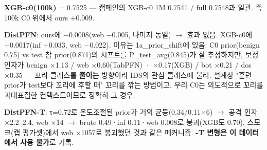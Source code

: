 \par\noindent \textbullet\enspace \textbf{XGB-c0(100k)} =\allowbreak{} 0.7525 — 캠페인의 XGB-c0 1M 0.7541 /\allowbreak{} full 0.7548과 일관. 즉 100k C0 위에서 ours +\allowbreak{}0.009.


\par\noindent \textbullet\enspace \textbf{DistPFN}: ours에 −0.0008(web −0.005, 나머지 동일)  \ensuremath{\rightarrow}  효과 없음. XGB-c0에 +\allowbreak{}0.0017(inf +\allowbreak{}0.033, web −0.022). 이유는 1a\_\allowbreak{}prior\_\allowbreak{}shift에 있음: C0 prior(benign 0.75) vs test 참 prior(0.871)의 시프트를 P\_\allowbreak{}test\_\allowbreak{}avg(0.845)가 잘 추정하지만, 보정 인자가 benign ×1.13 /\allowbreak{} web ×0.60(TabPFN) · ×0.17(XGB) /\allowbreak{} bot ×0.21 /\allowbreak{} dos ×0.35 — 꼬리 클래스를 \textbf{줄이는} 방향이라 IDS의 관심 클래스에 불리. 설계상 "훈련 prior가 test보다 꼬리에 후할 때" 꼬리를 깎는 방법이고, 우리 C0는 의도적으로 꼬리를 과대표집한 컨텍스트이므로 정확히 그 경우.


\par\noindent \textbullet\enspace \textbf{DistPFN-T}: τ=\allowbreak{}0.72로 온도조절된 prior가 거의 균등(0.34/\allowbreak{}0.11×6)  \ensuremath{\rightarrow}  공격 인자 ×2.2–2.4, web ×14  \ensuremath{\rightarrow}  brute 0.49·inf 0.11·web 0.008로 붕괴(XGB도 0.70). 스모크(캡 평가셋)에서 web ×1057로 붕괴했던 것과 같은 메커니즘. \textbf{-T 변형은 이 데이터에서 사용 불가}로 기록.


